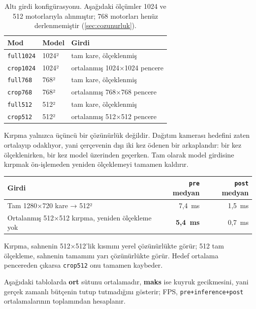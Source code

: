 \begin{table}[H]
  \centering
  \caption{Altı girdi konfigürasyonu. Aşağıdaki ölçümler 1024 ve 512
    motorlarıyla alınmıştır; 768 motorları henüz derlenmemiştir
    (\cref{sec:cozunurluk}).}
  \begin{tabular}{lll}
    \toprule
    Mod & Model & Girdi \\
    \midrule
    \texttt{full1024} & 1024² & tam kare, ölçeklenmiş \\
    \texttt{crop1024} & 1024² & ortalanmış 1024×1024 pencere \\
    \texttt{full768} & 768² & tam kare, ölçeklenmiş \\
    \texttt{crop768} & 768² & ortalanmış 768×768 pencere \\
    \texttt{full512} & 512² & tam kare, ölçeklenmiş \\
    \texttt{crop512} & 512² & ortalanmış 512×512 pencere \\
    \bottomrule
  \end{tabular}
\end{table}

Kırpma yalnızca üçüncü bir çözünürlük değildir. Dağıtım kamerası
hedefini zaten ortalayıp odaklıyor, yani çerçevenin dışı iki kez ödenen
bir arkaplandır: bir kez ölçeklenirken, bir kez model üzerinden
geçerken. Tam olarak model girdisine kırpmak ön-işlemeden yeniden
ölçeklemeyi tamamen kaldırır.

\begin{yapisal}[title={CPU'da, yapısal: aynı klip, aynı 512 model, yalnızca girdi dönüşümü farklı}]
\begin{center}
\begin{tabular}{lrr}
  \toprule
  Girdi & \texttt{pre} medyan & \texttt{post} medyan \\
  \midrule
  Tam 1280×720 kare → 512² & 7,4~ms & 1,5~ms \\
  Ortalanmış 512×512 kırpma, yeniden ölçekleme yok & \textbf{5,4~ms} & 0,7~ms \\
  \bottomrule
\end{tabular}
\end{center}
\end{yapisal}

Kırpma, sahnenin 512×512'lik kısmını yerel çözünürlükte görür; 512 tam
ölçekleme, sahnenin tamamını yarı çözünürlükte görür. Hedef ortalama
pencereden çıkarsa \texttt{crop512} onu tamamen kaybeder.

Aşağıdaki tablolarda \textbf{ort} sütunu ortalamadır, \textbf{maks}
ise kuyruk gecikmesini, yani gerçek zamanlı bütçenin tutup
tutmadığını gösterir; FPS, \texttt{pre+inference+post}
ortalamalarının toplamından hesaplanır.

